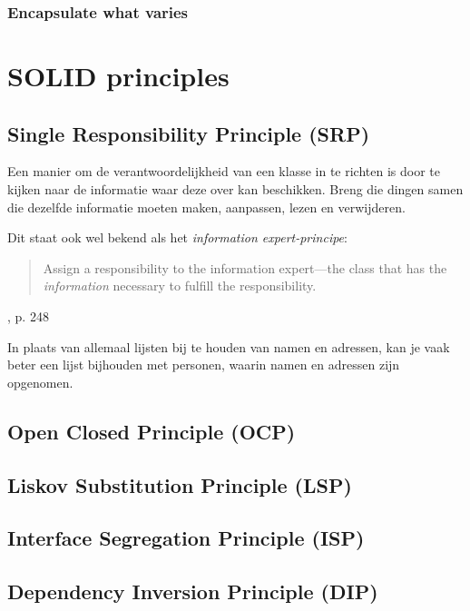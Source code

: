 \subsubsection{Encapsulate what varies}


\section{SOLID principles}

\subsection{Single Responsibility Principle (SRP)}
Een manier om de verantwoordelijkheid van een klasse in te richten 
is door te kijken naar de informatie waar deze over kan beschikken. 
Breng die dingen samen die dezelfde informatie moeten 
maken, aanpassen, lezen en verwijderen.

Dit staat ook wel bekend als 
het \emph{information expert-principe}:
\blockquote{
    Assign a responsibility to the information expert---the class 
    that has the \emph{information} necessary to fulfill the responsibility.
}{\cite{Larman2004}, p. 248}

In plaats van allemaal lijsten bij te houden van namen en adressen,
kan je vaak beter een lijst bijhouden met personen, waarin namen en adressen
zijn opgenomen.

\subsection{Open Closed Principle (OCP)}

\subsection{Liskov Substitution Principle (LSP)}

\subsection{Interface Segregation Principle (ISP)}

\subsection{Dependency Inversion Principle (DIP)}
